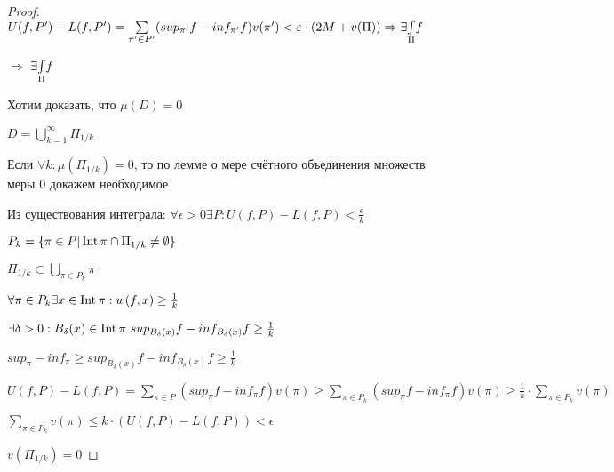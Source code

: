 \begin{proof}
        \bigskip
        \par $U(f, P') - L(f, P') = \sum\limits_{\pi' \in P'} (sup_{\pi'} f - inf_{\pi'} f) v(\pi') < \varepsilon \cdot (2M + v(\Pi)) \Rightarrow \exists \underset{\Pi}{\int} f$ 
        \bigskip
        \par $\boxed{\Rightarrow}$ $\exists \underset{\Pi}{\int} f$
        \par Хотим доказать, что $\mu(D) = 0$
        \par $D = \bigcup\limits_{k=1}^{\infty} \Pi_{1/k}$
        \par Если $\forall k: \mu(\Pi_{1/k}) = 0$, то по лемме о мере счётного объединения множеств меры 0 докажем необходимое
        \bigskip
        \par Из существования интеграла: $\forall \epsilon>0 \exists P: U(f, P) - L(f, P) < \frac{\epsilon}{k}$
        \par $P_k = \{\pi \in P | \operatorname{Int} \pi \cap \Pi_{1/k} \not = \emptyset \}$
        \par $\Pi_{1/k} \subset \bigcup\limits_{\pi \in P_k} \pi$
        \par $\forall \pi \in P_k \exists x \in \operatorname{Int} \pi: w(f, x) \ge \frac{1}{k}$
        \par $\exists \delta > 0: B_{\delta}(x) \in \operatorname{Int}  \pi \ sup_{B_{\delta}(x)} f - inf_{B_{\delta}(x)} f \ge \frac{1}{k}$
        \par $sup_{\pi} - inf_{\pi} \ge sup_{B_{\delta}(x)} f - inf_{B_{\delta}(x)} f \ge\frac{1}{k}$
        \bigskip
        \par $U(f, P) - L(f, P) = \sum\limits_{\pi \in P} (sup_{\pi} f - inf_{\pi} f) v(\pi) \ge \sum\limits_{\pi \in P_k} (sup_{\pi} f - inf_{\pi} f) v(\pi) \ge \frac{1}{k} \cdot \sum\limits_{\pi \in P_k} v(\pi)$
        \par $\sum\limits_{\pi \in P_k} v(\pi) \le k \cdot (U(f, P) - L(f, P)) < \epsilon$
        \bigskip
        \par $v(\Pi_{1/k}) = 0$ 



    \end{proof}


